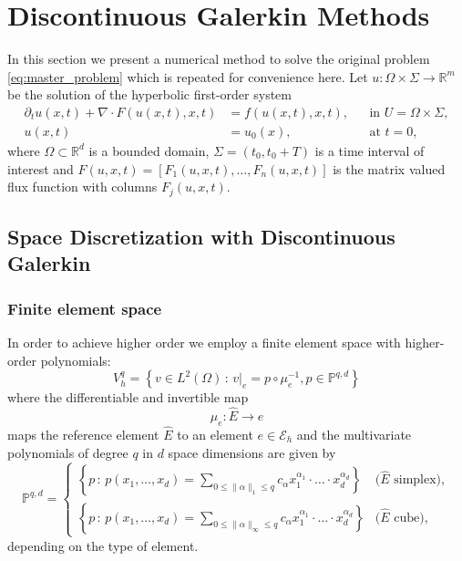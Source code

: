 \documentclass[a4paper,12pt]{article}
\theoremstyle{definition}
\theoremstyle{definition}
\newcommand{\Dim}{d}
\begin{document}
\section{Discontinuous Galerkin Methods}

In this section we present a numerical method to solve the original
problem \eqref{eq:master_problem} which is repeated for convenience here.
Let $u: \Omega\times\Sigma\to\mathbb{R}^m$ be the solution of the
hyperbolic first-order system
\begin{subequations}
	\label{eq:master_problem_repeated}
	\begin{align}
	\partial_t u(x,t) + \nabla\cdot F(u(x,t),x,t) &= f(u(x,t),x,t), &&\text{in $U=\Omega\times\Sigma$}, \\
	u(x,t) &= u_0(x), &&\text{at $t=0$},
	\end{align}
\end{subequations}
where $\Omega\subset\mathbb{R}^{\Dim}$ is a bounded domain, $\Sigma=(t_0,t_0+T)$
is a time interval of interest and $F(u,x,t)=[F_1(u,x,t),\ldots,F_n(u,x,t)]$ is the
matrix valued flux function with columns $F_j(u,x,t)$.

\subsection{Space Discretization with Discontinuous Galerkin}


\subsubsection*{Finite element space}


In order to achieve higher order we employ a finite element space with higher-order polynomials:
\begin{equation}
V_h^q = \left\{ v\in L^2(\Omega) \,:\,
v|_e = p\circ\mu_e^{-1}, p\in\mathbb{P}^{q,d}\right\}
\end{equation}
where the differentiable and invertible map $$\mu_e : \hat{E} \to e$$
maps the reference element $\hat{E}$ to an element $e\in\mathcal{E}_h$ and the multivariate
polynomials of degree $q$ in $d$ space dimensions are given by
\begin{equation*}
\mathbb{P}^{q,d} = \left\{\begin{array}{ll}
\left\{ p\,:\, p(x_1,\ldots,x_d) = \sum\limits_{0\leq\|\alpha\|_1\leq q} c_\alpha
x_1^{\alpha_1}\cdot\ldots\cdot x_d^{\alpha_d}\right\} & \text{($\hat{E}$ simplex)}, \\
\left\{ p\,:\, p(x_1,\ldots,x_d) = \sum\limits_{0\leq\|\alpha\|_\infty\leq q} c_\alpha
x_1^{\alpha_1}\cdot\ldots\cdot x_d^{\alpha_d}\right\} & \text{($\hat{E}$ cube)},
\end{array}\right .
\end{equation*}
depending on the type of element.
\end{document}
